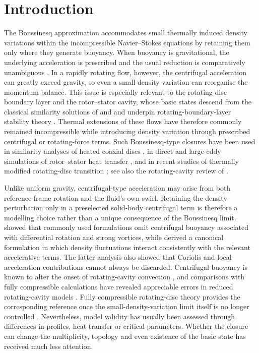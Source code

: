 
\section{Introduction}\label{sec:introduction}

The Boussinesq approximation accommodates small thermally induced density
variations within the incompressible Navier--Stokes equations by retaining them
only where they generate buoyancy.  When buoyancy is gravitational, the
underlying acceleration is prescribed and the usual reduction is comparatively
unambiguous \citep{GrayGiorgini1976}.  In a rapidly rotating flow, however, the
centrifugal acceleration can greatly exceed gravity, so even a small density
variation can reorganise the momentum balance.  This issue is especially
relevant to the rotating-disc boundary layer and the rotor--stator cavity,
whose basic states descend from the classical similarity solutions of
\citet{Cochran1934} and \citet{Batchelor1951} and underpin rotating-boundary-layer
stability theory \citep{Lingwood1995}.  Thermal extensions of these flows have
therefore commonly remained incompressible while introducing density variation
through prescribed centrifugal or rotating-force terms.  Such Boussinesq-type
closures have been used in similarity analyses of heated coaxial discs
\citep{Soong1996IJHMT,Soong1996IJRM}, in direct and large-eddy simulations of
rotor--stator heat transfer \citep{SerreEtAl2004,PoncetSerre2009,WangEtAl2023},
and in recent studies of thermally modified rotating-disc transition
\citep{DuEtAl2024}; see also the rotating-cavity review of
\citet{OwenLong2015}.

Unlike uniform gravity, centrifugal-type acceleration may arise from both
reference-frame rotation and the fluid's own swirl.  Retaining the density
perturbation only in a preselected solid-body centrifugal term is therefore a
modelling choice rather than a unique consequence of the Boussinesq limit.
\citet{LopezEtAl2013} showed that commonly used formulations omit centrifugal
buoyancy associated with differential rotation and strong vortices, while
\citet{BlackburnEtAl2021} derived a canonical formulation in which density
fluctuations interact consistently with the relevant accelerative terms.  The
latter analysis also showed that Coriolis and local-acceleration contributions
cannot always be discarded.  Centrifugal buoyancy is known to alter the onset
of rotating-cavity convection \citep{PitzEtAl2017}, and comparisons with fully
compressible calculations have revealed appreciable errors in reduced
rotating-cavity models \citep{GaoEtAl2020}.  Fully compressible rotating-disc
theory provides the corresponding reference once the small-density-variation
limit itself is no longer controlled \citep{TurkyilmazogluUygun2006}.
Nevertheless, model validity has usually been assessed through differences in
profiles, heat transfer or critical parameters.  Whether the closure can
change the multiplicity, topology and even existence of the basic state has
received much less attention.

